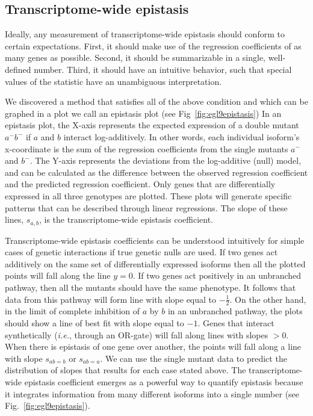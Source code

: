 \documentclass[9pt,twocolumn,twoside]{pnas-new}
\begin{document}
\subsection*{Transcriptome-wide epistasis}
Ideally, any measurement of transcriptome-wide epistasis should conform to
certain expectations. First, it should make use of the regression coefficients
of as many genes as possible. Second, it should be summarizable in a single,
well-defined number. Third, it should have an intuitive behavior, such that
special values of the statistic have an unambiguous interpretation.

We discovered a method that satisfies all of the above condition and which can
be graphed in a plot we call an epistasis plot (see Fig~\ref{fig:egl9epistasis})
In an epistasis plot, the X-axis represents the expected expression of a double
mutant $a^-b^-$ if $a$ and $b$ interact log-additively. In other words, each
individual isoform's x-coordinate is the sum of the regression coefficients from
the single mutants $a^-$ and $b^-$. The Y-axis represents the deviations from
the log-additive (null) model, and can be calculated as the difference between
the observed regression coefficient and the predicted regression coefficient.
Only genes that are differentially expressed in all three genotypes are plotted.
These plots will generate specific patterns that can be described through linear
regressions. The slope of these lines, $s_{a,b}$, is the transcriptome-wide
epistasis coefficient.

Transcriptome-wide epistasis coefficients can be understood intuitively for
simple cases of genetic interactions if true genetic nulls are used. If two
genes act additively on the same set of differentially expressed isoforms then
all the plotted points will fall along the line $y=0$. If two genes act
positively in an unbranched pathway, then all the mutants should have the same
phenotype. It follows that data from this pathway will form line with slope
equal to $-\frac{1}{2}$. On the other hand, in the limit of complete inhibition
of $a$ by $b$ in an unbranched pathway, the plots should show a line of best fit
with slope equal to $-1$.
Genes that interact synthetically (\emph{i.e.}, through an OR-gate)
will fall along lines with slopes $>0$. When there is epistasis of one gene over
another, the points will fall along a line with slope $s_{ab=b}$ or $s_{ab=a}$.
We can use the single mutant data to predict the distribution of slopes that
results for each case stated above. The transcriptome-wide epistasis coefficient
emerges as a powerful way to quantify epistasis because it integrates
information from many different isoforms into a single number (see
Fig.~\ref{fig:egl9epistasis}).
\end{document}
